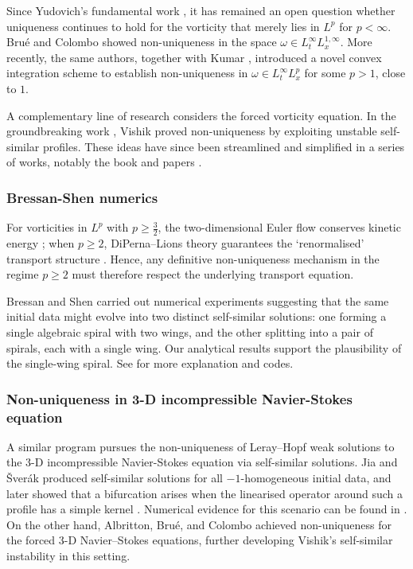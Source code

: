 \documentclass[11pt]{article}
\theoremstyle{definition}
\theoremstyle{remark}
\numberwithin{equation}{section}
\begin{document}
Since Yudovich's fundamental work \cite{Yud63, Yud95}, it has remained an open question whether uniqueness continues to hold for the vorticity that merely lies in $L^p$ for $p<\infty$. Bru\'e and Colombo \cite{BC23} showed non-uniqueness in the space $\omega\in L^\infty_t L^{1,\infty}_x$. More recently, the same authors, together with Kumar \cite{BCK24}, introduced a novel convex integration scheme to establish non-uniqueness in $\omega\in L^\infty_t L^p_x$ for some $p >1$, close to $1$.

A complementary line of research considers the forced vorticity equation. In the groundbreaking work \cite{Visa, Visb}, Vishik proved non-uniqueness by exploiting unstable self-similar profiles. These ideas have since been streamlined and simplified in a series of works, notably the book \cite{ABCDGJK24} and papers \cite{DM25, CFMS25}.

\subsubsection{Bressan-Shen numerics}

For vorticities in $L^p$ with $p\geq \frac{3}{2}$, the two-dimensional Euler flow conserves kinetic energy \cite{CLNS16}; when $p\geq 2$, DiPerna–Lions theory guarantees the `renormalised' transport structure \cite{DL89}. Hence, any definitive non-uniqueness mechanism in the regime $p\geq 2$ must therefore respect the underlying transport equation.

Bressan and Shen carried out numerical experiments suggesting that the same initial data might evolve into two distinct self-similar solutions: one forming a single algebraic spiral with two wings, and the other splitting into a pair of spirals, each with a single wing. Our analytical results support the plausibility of the single-wing spiral. See \cite{BM20, BS21, Shen23} for more explanation and codes.

\subsubsection{Non-uniqueness in 3-D incompressible Navier-Stokes equation}

A similar program pursues the non-uniqueness of Leray–Hopf weak solutions to the 3-D incompressible Navier-Stokes equation via self-similar solutions. Jia and Šverák \cite{JS14} produced self-similar solutions for all $-1$-homogeneous initial data, and later showed that a bifurcation arises when the linearised operator around such a profile has a simple kernel \cite{JS15}. Numerical evidence for this scenario can be found in \cite{GS23}. On the other hand, Albritton, Bru\'e, and Colombo \cite{ABC22} achieved non-uniqueness for the forced 3-D Navier–Stokes equations, further developing Vishik’s self-similar instability in this setting.
\end{document}
